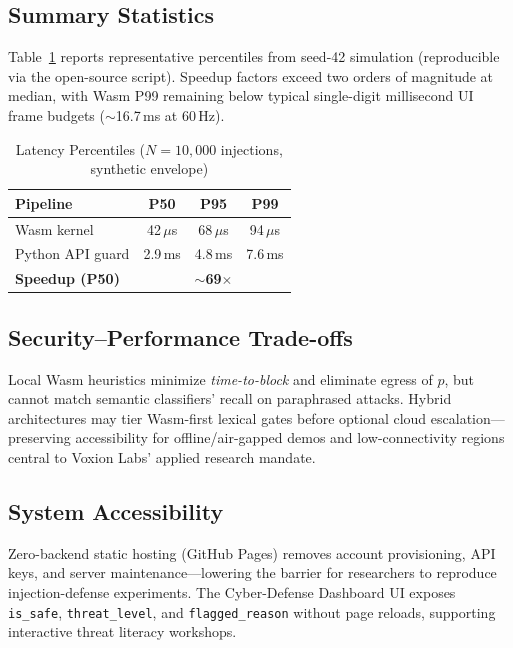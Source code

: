 \documentclass[conference]{IEEEtran}
\begin{document}
\subsection{Summary Statistics}

Table~\ref{tab:stats} reports representative percentiles from seed-42 simulation (reproducible via the open-source script). Speedup factors exceed two orders of magnitude at median, with Wasm P99 remaining below typical single-digit millisecond UI frame budgets ($\sim$16.7\,ms at 60\,Hz).

\begin{table}[t]
\centering
\caption{Latency Percentiles ($N=10{,}000$ injections, synthetic envelope)}
\label{tab:stats}
\begin{tabular}{@{}lccc@{}}
\toprule
\textbf{Pipeline} & \textbf{P50} & \textbf{P95} & \textbf{P99} \\
\midrule
Wasm kernel & 42\,$\mu$s & 68\,$\mu$s & 94\,$\mu$s \\
Python API guard & 2.9\,ms & 4.8\,ms & 7.6\,ms \\
\midrule
\textbf{Speedup (P50)} & \multicolumn{3}{c}{\textbf{$\sim$69$\times$}} \\
\bottomrule
\end{tabular}
\end{table}

\subsection{Security--Performance Trade-offs}

Local Wasm heuristics minimize \emph{time-to-block} and eliminate egress of $p$, but cannot match semantic classifiers' recall on paraphrased attacks. Hybrid architectures may tier Wasm-first lexical gates before optional cloud escalation---preserving accessibility for offline/air-gapped demos and low-connectivity regions central to Voxion Labs' applied research mandate.

\subsection{System Accessibility}

Zero-backend static hosting (GitHub Pages) removes account provisioning, API keys, and server maintenance---lowering the barrier for researchers to reproduce injection-defense experiments. The Cyber-Defense Dashboard UI exposes \texttt{is\_safe}, \texttt{threat\_level}, and \texttt{flagged\_reason} without page reloads, supporting interactive threat literacy workshops.
\end{document}
